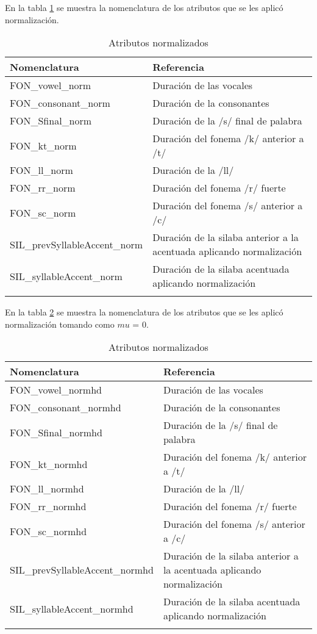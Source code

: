 En la tabla \ref{tab:attrNorm} se muestra la nomenclatura de los atributos que se les aplicó normalización.
\centering
\begin{longtable}{| p{} | p{} |} 
\hline
\textbf{Nomenclatura}  & \textbf{Referencia}   \\ \hline
FON\_vowel\_norm & Duración de las vocales \\ \hline
FON\_consonant\_norm & Duración de la consonantes \\ \hline
FON\_Sfinal\_norm & Duración de la /s/ final de palabra \\ \hline
FON\_kt\_norm & Duración del fonema /k/ anterior a /t/ \\ \hline
FON\_ll\_norm & Duración de la /ll/ \\ \hline
FON\_rr\_norm & Duración del fonema /r/ fuerte \\ \hline
FON\_sc\_norm & Duración del fonema /s/ anterior a /c/ \\ \hline
SIL\_prevSyllableAccent\_norm & Duración de la silaba anterior a la acentuada aplicando normalización\\ \hline
SIL\_syllableAccent\_norm & Duración de la silaba acentuada aplicando normalización \\ \hline
\caption{Atributos normalizados} 
\label{tab:attrNorm}
\end{longtable}

En la tabla \ref{tab:attrNormhd} se muestra la nomenclatura de los atributos que se les aplicó normalización tomando como $mu$ = 0.
\centering
\begin{longtable}{| p{} | p{} |} 
\hline
\textbf{Nomenclatura}  & \textbf{Referencia}   \\ \hline
FON\_vowel\_normhd & Duración de las vocales \\ \hline
FON\_consonant\_normhd & Duración de la consonantes \\ \hline
FON\_Sfinal\_normhd & Duración de la /s/ final de palabra \\ \hline
FON\_kt\_normhd & Duración del fonema /k/ anterior a /t/ \\ \hline
FON\_ll\_normhd & Duración de la /ll/ \\ \hline
FON\_rr\_normhd & Duración del fonema /r/ fuerte \\ \hline
FON\_sc\_normhd & Duración del fonema /s/ anterior a /c/ \\ \hline
SIL\_prevSyllableAccent\_normhd & Duración de la silaba anterior a la acentuada aplicando normalización\\ \hline
SIL\_syllableAccent\_normhd & Duración de la silaba acentuada aplicando normalización \\ \hline
\caption{Atributos normalizados} 
\label{tab:attrNormhd}
\end{longtable}